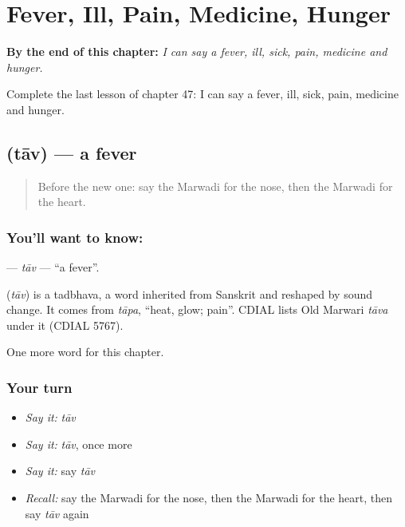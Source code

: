 
\chapter{Fever, Ill, Pain, Medicine, Hunger}
\label{ch:mw-fever-ill-pain-medicine-hunger}

\begin{chapteropening}
\textbf{By the end of this chapter:} \emph{I can say a fever, ill, sick, pain, medicine and hunger.}

Complete the last lesson of chapter 47: I can say a fever, ill, sick, pain, medicine and hunger.
\end{chapteropening}

\section[\texorpdfstring{\mw{ताव} (tāv)}{ताव (tāv)}]{ (tāv) — a fever}

\label{lesson:MW-C47-tav}



\begin{quote}
Before the new one: say the Marwadi for the nose, then the Marwadi for the heart.
\end{quote}

\subsection*{You'll want to know: }
\textbf{} — \emph{tāv} — \textquotedblleft{}a fever\textquotedblright{}.

\begin{cousinweb}
\textbf{} (\emph{tāv}) is a tadbhava, a word inherited from Sanskrit and reshaped by sound change. It comes from \emph{tāpa}, \textquotedblleft{}heat, glow; pain\textquotedblright{}. CDIAL lists Old Marwari \emph{tāva} under it (CDIAL 5767).
\end{cousinweb}

\begin{grammarlens}[title={What you've built}]
One more word for this chapter.
\end{grammarlens}

\subsection*{Your turn}
\begin{itemize}
\raggedright
  \item \emph{Say it:} \emph{tāv}
  \item \emph{Say it:} \emph{tāv}, once more
  \item \emph{Say it:} say \emph{tāv}
  \item \emph{Recall:} say the Marwadi for the nose, then the Marwadi for the heart, then say \emph{tāv} again
\end{itemize}

